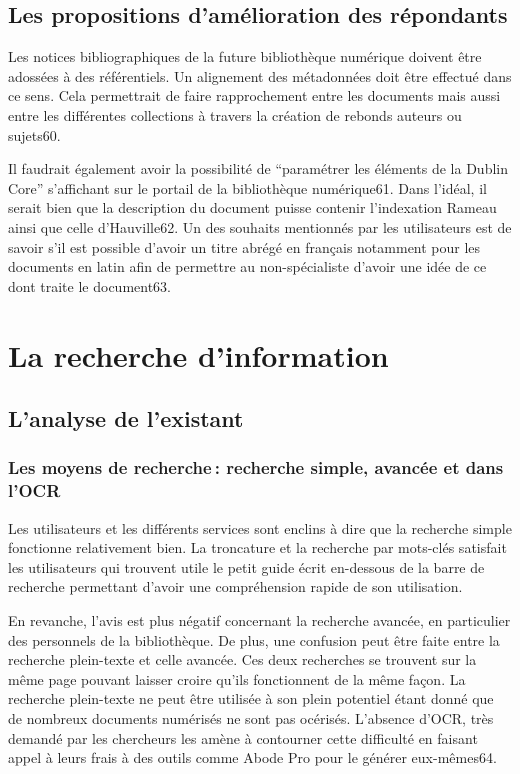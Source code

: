 \subsection{Les propositions d’amélioration des répondants} 

Les notices bibliographiques de la future bibliothèque numérique doivent être adossées à des référentiels. Un alignement des métadonnées doit être effectué dans ce sens. Cela permettrait de faire rapprochement entre les documents mais aussi entre les différentes collections à travers la création de rebonds auteurs ou sujets60.  

Il faudrait également avoir la possibilité de \enquote{paramétrer les éléments de la Dublin Core} s’affichant sur le portail de la bibliothèque numérique61. Dans l’idéal, il serait bien que la description du document puisse contenir l’indexation Rameau ainsi que celle d’Hauville62. Un des souhaits mentionnés par les utilisateurs est de savoir s’il est possible d’avoir un titre abrégé en français notamment pour les documents en latin afin de permettre au non-spécialiste d’avoir une idée de ce dont traite le document63.  



\section{La recherche d’information}

\subsection{L’analyse de l’existant}

\subsubsection{Les moyens de recherche : recherche simple, avancée et dans l’OCR}

Les utilisateurs et les différents services sont enclins à dire que la recherche simple fonctionne relativement bien. La troncature et la recherche par mots-clés satisfait les utilisateurs qui trouvent utile le petit guide écrit en-dessous de la barre de recherche permettant d’avoir une compréhension rapide de son utilisation.  

En revanche, l’avis est plus négatif concernant la recherche avancée, en particulier des personnels de la bibliothèque. De plus, une confusion peut être faite entre la recherche plein-texte et celle avancée. Ces deux recherches se trouvent sur la même page pouvant laisser croire qu’ils fonctionnent de la même façon. La recherche plein-texte ne peut être utilisée à son plein potentiel étant donné que de nombreux documents numérisés ne sont pas océrisés. L’absence d’OCR, très demandé par les chercheurs les amène à contourner cette difficulté en faisant appel à leurs frais à des outils comme Abode Pro pour le générer eux-mêmes64. 

